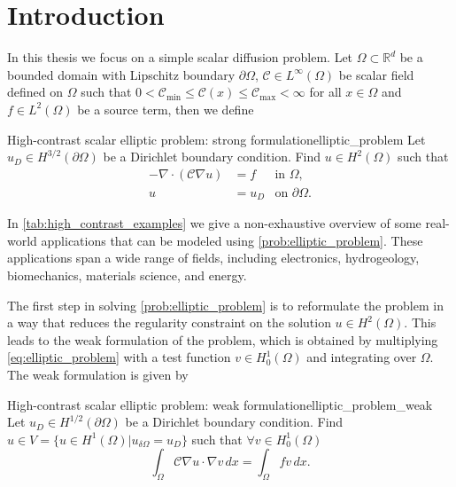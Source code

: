 \chapter{Introduction}\label{ch:introduction}
In this thesis we focus on a simple scalar diffusion problem. Let $\Omega\subset\mathbb{R}^d$ be a bounded domain with Lipschitz boundary $\partial\Omega$, $\mathcal{C}\in L^\infty(\Omega)$ be scalar field defined on $\Omega$ such that $0 < \mathcal{C}_{\min} \leq \mathcal{C}(x) \leq \mathcal{C}_{\max} < \infty$ for all $x\in\Omega$ and $f\in L^2(\Omega)$ be a source term, then we define
\begin{fancyprob}{High-contrast scalar elliptic problem: strong formulation}{elliptic_problem}
    Let $u_D\in H^{3/2}(\partial\Omega)$ be a Dirichlet boundary condition. Find $u\in H^2(\Omega)$ such that
    \begin{equation}
        \begin{aligned}
            -\nabla\cdot\left(\mathcal{C}\nabla u\right) & = f &\text{in } \Omega,           \\
            u                                       & = u_D &\text{on } \partial\Omega.
        \end{aligned}
        \label{eq:elliptic_problem}
    \end{equation}
\end{fancyprob}

In \cref{tab:high_contrast_examples} we give a non-exhaustive overview of some real-world applications that can be modeled using \cref{prob:elliptic_problem}. These applications span a wide range of fields, including electronics, hydrogeology, biomechanics, materials science, and energy.


The first step in solving \cref{prob:elliptic_problem} is to reformulate the problem in a way that reduces the regularity constraint on the solution $u\in H^2(\Omega)$. This leads to the weak formulation of the problem, which is obtained by multiplying \cref{eq:elliptic_problem} with a test function $v\in H^1_0(\Omega)$ and integrating over $\Omega$. The weak formulation is given by
\begin{fancyprob}{High-contrast scalar elliptic problem: weak formulation}{elliptic_problem_weak}
    Let $u_D\in H^{1/2}(\partial\Omega)$ be a Dirichlet boundary condition. Find $u\in V = \{u\in H^1(\Omega) | u_{\delta \Omega} = u_D\}$ such that $\forall v \in H^1_0(\Omega)$
    \begin{equation}
        \label{eq:galerkin}
        \int_\Omega \mathcal{C}\nabla u\cdot\nabla v\,dx = \int_\Omega f v\,dx.
    \end{equation}
\end{fancyprob}

